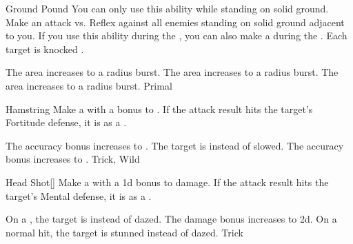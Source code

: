 \lowercase{\hypertarget{maneuver:Ground Pound}{}}\label{maneuver:Ground Pound}
\begin{apability}{\hypertarget{maneuver:Ground Pound}{Ground Pound}}
You can only use this ability while standing on solid ground.
Make an attack vs. Reflex against all enemies standing on solid ground adjacent to you.
If you use this ability during the , you can also make a  during the .
\hit Each target is knocked \prone.

\rankline
{} The area increases to a \areamed radius burst.
 The area increases to a \arealarge radius burst.
 The area increases to a \areahuge radius burst.
 Primal
\end{apability}
\vspace{0.25em}



\lowercase{\hypertarget{maneuver:Hamstring}{}}\label{maneuver:Hamstring}
\begin{apability}{\hypertarget{maneuver:Hamstring}{Hamstring}}
Make a  with a  bonus to .
If the attack result hits the target's Fortitude defense,
it is  as a .

\rankline
{} The accuracy bonus increases to .
 The target is  instead of slowed.
 The accuracy bonus increases to .
 Trick, Wild
\end{apability}
\vspace{0.25em}



\lowercase{\hypertarget{maneuver:Head Shot}{}}\label{maneuver:Head Shot}
\begin{apability}{\hypertarget{maneuver:Head Shot}{Head Shot}}[]
Make a  with a \plus1d bonus to damage.
If the attack result hits the target's Mental defense,
it is  as a .

\rankline
{} On a , the target is  instead of dazed.
 The damage bonus increases to \plus2d.
 On a normal hit, the target is stunned instead of dazed.
 Trick
\end{apability}
\vspace{0.25em}



